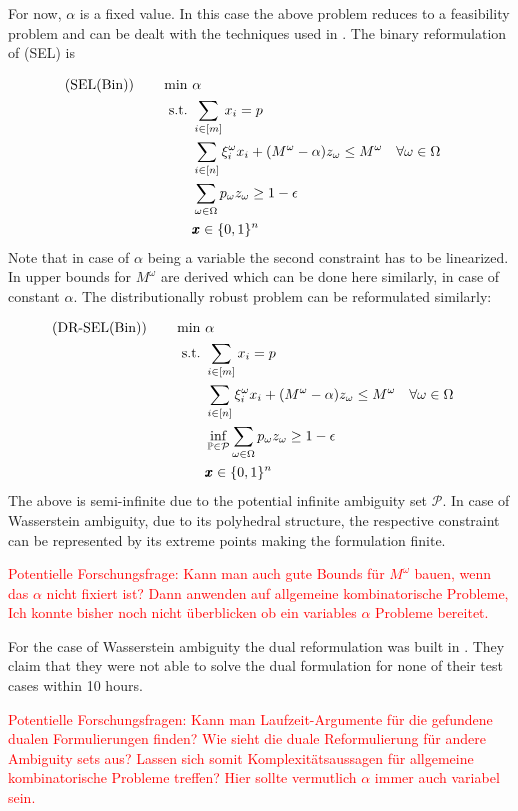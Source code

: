 \documentclass[a4paper,abstracton]{scrartcl}
\begin{document}
For now, $\alpha$ is a fixed value. In this case the above problem reduces to a feasibility problem and can be dealt with the techniques used in \cite{wang2019solution}. The binary reformulation of (SEL) is 

\begin{align*}
\textnormal{(SEL(Bin))} \qquad\min \ & \alpha\\
\textnormal{s.t.}\ & \sum_{i \in [m]} x_i =p \\
&\sum_{i \in [n]} \xi_i^\omega x_i + (M^\omega - \alpha) z_\omega \leq M^\omega && \forall\omega \in \Omega\\
&\sum_{\omega \in \Omega} p_\omega z_\omega \geq 1-\epsilon\\
& \pmb{x} \in \{0,1\}^n
\end{align*}
Note that in case of $\alpha$ being a variable the second constraint has to be linearized. In \cite{wang2019solution} upper bounds for $M^\omega$ are derived which can be done here similarly, in case of constant $\alpha$. The distributionally robust problem can be reformulated similarly:

\begin{align*}
\textnormal{(DR-SEL(Bin))} \qquad\min \ & \alpha\\
\textnormal{s.t.}\ & \sum_{i \in [m]} x_i =p \\
&\sum_{i \in [n]} \xi_i^\omega x_i + (M^\omega - \alpha) z_\omega \leq M^\omega && \forall\omega \in \Omega\\
&\inf_{\mathbb{P}\in \mathcal{P}} \sum_{\omega \in \Omega} p_\omega z_\omega \geq 1-\epsilon\\
& \pmb{x} \in \{0,1\}^n
\end{align*}
The above is semi-infinite due to the potential infinite ambiguity set $\mathcal{P}$. In case of Wasserstein ambiguity, due to its polyhedral structure, the respective constraint can be represented by its extreme points making the formulation finite.

\textcolor{red}{Potentielle Forschungsfrage: Kann man auch gute Bounds für $M^\omega$ bauen, wenn das $\alpha$ nicht fixiert ist? Dann anwenden auf allgemeine kombinatorische Probleme, Ich konnte bisher noch nicht überblicken ob ein variables $\alpha$ Probleme bereitet.}

For the case of Wasserstein ambiguity the dual reformulation was built in \cite{wang2019solution}.  They claim that they were not able to solve the dual formulation for none of their test cases within 10 hours.

\textcolor{red}{Potentielle Forschungsfragen: Kann man Laufzeit-Argumente für die gefundene dualen Formulierungen finden? Wie sieht die duale Reformulierung für andere Ambiguity sets aus? Lassen sich somit Komplexitätsaussagen für allgemeine kombinatorische Probleme treffen? Hier sollte vermutlich $\alpha$ immer auch variabel sein.}
\end{document}
